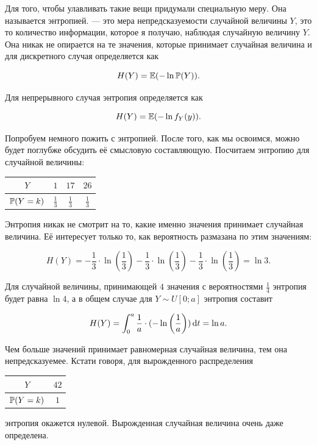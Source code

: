 \documentclass[12pt, a4paper, oneside]{article}
\begin{document}
Для того, чтобы улавливать такие вещи придумали специальную меру. Она называется энтропией.   --- это мера непредсказуемости случайной величины $Y$, это то количество информации, которое я получаю, наблюдая случайную величину $Y$.  Она никак не опирается на те значения, которые принимает случайная величина и для дискретного случая определяется  как 

\[ H(Y) = \mathbb{E}(- \ln \mathbb{P}(Y)). \]

Для непрерывного случая  энтропия определяется как 

\[ H(Y) = \mathbb{E}(- \ln f_Y(y)). \]

Попробуем немного пожить с энтропией. После того, как мы освоимся, можно будет поглубже обсудить её смысловую составляющую. Посчитаем энтропию для случайной величины:

\begin{center}
	\begin{tabular}{c|c|c|c}
		$Y$ & $1$ & $17$  &  $26$  \\ \hline
		$\mathbb{P}(Y = k)$ & $\frac{1}{3}$ & $\frac{1}{3}$  & $\frac{1}{3}$ 
	\end{tabular}
\end{center}

Энтропия никак не смотрит на то, какие именно значения принимает случайная величина. Её интересует только то, как вероятность размазана по этим значениям:

\[ H(Y) = - \frac{1}{3} \cdot \ln \left(\frac{1}{3}\right)- \frac{1}{3} \cdot \ln \left(\frac{1}{3}\right) - \frac{1}{3} \cdot \ln \left(\frac{1}{3}\right) = \ln 3.\] 

Для случайной величины, принимающей $4$ значения с вероятностями $\frac{1}{4}$ энтропия будет равна $\ln 4$, а в общем случае для $Y \sim U[0;a]$ энтропия составит 

\[H(Y) = \int_0^a \frac{1}{a} \cdot (- \ln\left(\frac{1}{a}\right)) \,\mathrm{d}t = \ln a. \]

Чем больше значений принимает равномерная случайная величина, тем она непредсказуемее.  Кстати говоря, для вырожденного распределения 

\begin{center}
	\begin{tabular}{c|c}
		$Y$ & $42$   \\ \hline
		$\mathbb{P}(Y = k)$ & $1$
	\end{tabular}
\end{center}

энтропия окажется нулевой. Вырожденная случайная величина очень даже определена. 
\end{document}
